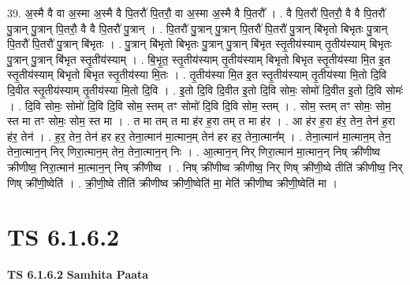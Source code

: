 \documentclass[17pt]{extarticle}
\begin{document}
39. अ॒स्मै वै वा अ॒स्मा अ॒स्मै वै पि॒तरौ॑ पि॒तरौ॒ वा अ॒स्मा अ॒स्मै वै पि॒तरौ᳚ । . वै पि॒तरौ॑ पि॒तरौ॒ वै वै पि॒तरौ॑ पु॒त्रान् पु॒त्रान् पि॒तरौ॒ वै वै पि॒तरौ॑ पु॒त्रान् । . पि॒तरौ॑ पु॒त्रान् पु॒त्रान् पि॒तरौ॑ पि॒तरौ॑ पु॒त्रान् बि॑भृतो बिभृतः पु॒त्रान् पि॒तरौ॑ पि॒तरौ॑ पु॒त्रान् बि॑भृतः । . पु॒त्रान् बि॑भृतो बिभृतः पु॒त्रान् पु॒त्रान् बि॑भृत स्तृ॒तीय॑स्याम् तृ॒तीय॑स्याम् बिभृतः पु॒त्रान् पु॒त्रान् बि॑भृत स्तृ॒तीय॑स्याम् । . बि॒भृ॒त॒ स्तृ॒तीय॑स्याम् तृ॒तीय॑स्याम् बिभृतो बिभृत स्तृ॒तीय॑स्या मि॒त इ॒त स्तृ॒तीय॑स्याम् बिभृतो बिभृत स्तृ॒तीय॑स्या मि॒तः । . तृ॒तीय॑स्या मि॒त इ॒त स्तृ॒तीय॑स्याम् तृ॒तीय॑स्या मि॒तो दि॒वि दि॒वीत स्तृ॒तीय॑स्याम् तृ॒तीय॑स्या मि॒तो दि॒वि । . इ॒तो दि॒वि दि॒वीत इ॒तो दि॒वि सोमः॒ सोमो॑ दि॒वीत इ॒तो दि॒वि सोमः॑ । . दि॒वि सोमः॒ सोमो॑ दि॒वि दि॒वि सोम॒ स्तम् तꣳ सोमो॑ दि॒वि दि॒वि सोम॒ स्तम् । . सोम॒ स्तम् तꣳ सोमः॒ सोम॒ स्त मा तꣳ सोमः॒ सोम॒ स्त मा । . त मा तम् त मा ह॑र ह॒रा तम् त मा ह॑र । . आ ह॑र ह॒रा ह॑र॒ तेन॒ तेन॑ ह॒रा ह॑र॒ तेन॑ । . ह॒र॒ तेन॒ तेन॑ हर हर॒ तेना॒त्मान॑ मा॒त्मान॒म् तेन॑ हर हर॒ तेना॒त्मान᳚म् । . तेना॒त्मान॑ मा॒त्मान॒म् तेन॒ तेना॒त्मान॒न् निर् णिरा॒त्मान॒म् तेन॒ तेना॒त्मान॒न् निः । . आ॒त्मान॒न् निर् णिरा॒त्मान॑ मा॒त्मान॒न् निष् क्री॑णीष्व क्रीणीष्व॒ निरा॒त्मान॑ मा॒त्मान॒न् निष् क्री॑णीष्व । . निष् क्री॑णीष्व क्रीणीष्व॒ निर् णिष् क्री॑णी॒ष्वे तीति॑ क्रीणीष्व॒ निर् णिष् क्री॑णी॒ष्वेति॑ । . क्री॒णी॒ष्वे तीति॑ क्रीणीष्व क्रीणी॒ष्वेति॑ मा॒ मेति॑ क्रीणीष्व क्रीणी॒ष्वेति॑ मा । \newline
\pagebreak
{}

\section{ TS 6.1.6.2 }

\textbf{TS 6.1.6.2 } \newline
\textbf{Samhita Paata} \newline
\end{document}
